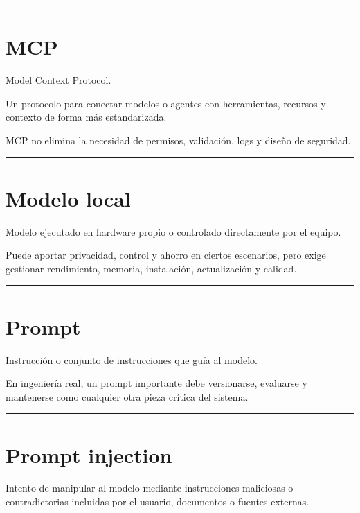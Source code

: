 \begin{center}\rule{0.5\linewidth}{0.5pt}\end{center}

\section{MCP}\label{mcp-1}

Model Context Protocol.

Un protocolo para conectar modelos o agentes con herramientas, recursos
y contexto de forma más estandarizada.

MCP no elimina la necesidad de permisos, validación, logs y diseño de
seguridad.

\begin{center}\rule{0.5\linewidth}{0.5pt}\end{center}

\section{Modelo local}\label{modelo-local}

Modelo ejecutado en hardware propio o controlado directamente por el
equipo.

Puede aportar privacidad, control y ahorro en ciertos escenarios, pero
exige gestionar rendimiento, memoria, instalación, actualización y
calidad.

\begin{center}\rule{0.5\linewidth}{0.5pt}\end{center}

\section{Prompt}\label{prompt-2}

Instrucción o conjunto de instrucciones que guía al modelo.

En ingeniería real, un prompt importante debe versionarse, evaluarse y
mantenerse como cualquier otra pieza crítica del sistema.

\begin{center}\rule{0.5\linewidth}{0.5pt}\end{center}

\section{Prompt injection}\label{prompt-injection-2}

Intento de manipular al modelo mediante instrucciones maliciosas o
contradictorias incluidas por el usuario, documentos o fuentes externas.


